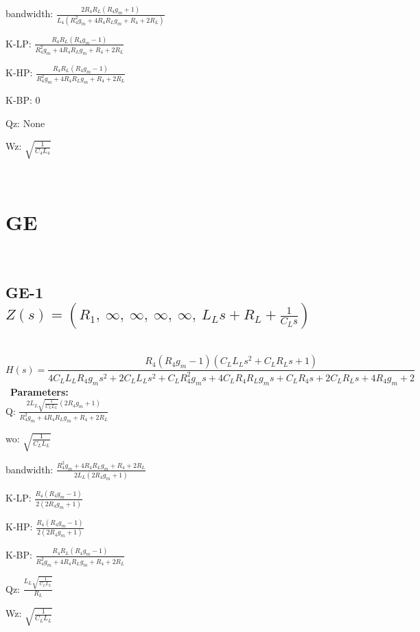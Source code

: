 \documentclass{article}
\begin{document}
bandwidth: $\frac{2 R_{4} R_{L} \left(R_{4} g_{m} + 1\right)}{L_{4} \left(R_{4}^{2} g_{m} + 4 R_{4} R_{L} g_{m} + R_{4} + 2 R_{L}\right)}$\ 

K-LP: $\frac{R_{4} R_{L} \left(R_{4} g_{m} - 1\right)}{R_{4}^{2} g_{m} + 4 R_{4} R_{L} g_{m} + R_{4} + 2 R_{L}}$\ 

K-HP: $\frac{R_{4} R_{L} \left(R_{4} g_{m} - 1\right)}{R_{4}^{2} g_{m} + 4 R_{4} R_{L} g_{m} + R_{4} + 2 R_{L}}$\ 

K-BP: $0$\ 

Qz: $\text{None}$\ 

Wz: $\sqrt{\frac{1}{C_{4} L_{4}}}$\ 

\ 

\section{GE}\ 
\subsection{GE-1 $Z(s) = \left( R_{1}, \  \infty, \  \infty, \  \infty, \  \infty, \  L_{L} s + R_{L} + \frac{1}{C_{L} s}\right)$ } \ 
\textbf{\[H(s) = \frac{R_{4} \left(R_{4} g_{m} - 1\right) \left(C_{L} L_{L} s^{2} + C_{L} R_{L} s + 1\right)}{4 C_{L} L_{L} R_{4} g_{m} s^{2} + 2 C_{L} L_{L} s^{2} + C_{L} R_{4}^{2} g_{m} s + 4 C_{L} R_{4} R_{L} g_{m} s + C_{L} R_{4} s + 2 C_{L} R_{L} s + 4 R_{4} g_{m} + 2}\] } \ 
\textbf{Parameters:}\\ 

Q: $\frac{2 L_{L} \sqrt{\frac{1}{C_{L} L_{L}}} \left(2 R_{4} g_{m} + 1\right)}{R_{4}^{2} g_{m} + 4 R_{4} R_{L} g_{m} + R_{4} + 2 R_{L}}$\ 

wo: $\sqrt{\frac{1}{C_{L} L_{L}}}$\ 

bandwidth: $\frac{R_{4}^{2} g_{m} + 4 R_{4} R_{L} g_{m} + R_{4} + 2 R_{L}}{2 L_{L} \left(2 R_{4} g_{m} + 1\right)}$\ 

K-LP: $\frac{R_{4} \left(R_{4} g_{m} - 1\right)}{2 \left(2 R_{4} g_{m} + 1\right)}$\ 

K-HP: $\frac{R_{4} \left(R_{4} g_{m} - 1\right)}{2 \left(2 R_{4} g_{m} + 1\right)}$\ 

K-BP: $\frac{R_{4} R_{L} \left(R_{4} g_{m} - 1\right)}{R_{4}^{2} g_{m} + 4 R_{4} R_{L} g_{m} + R_{4} + 2 R_{L}}$\ 

Qz: $\frac{L_{L} \sqrt{\frac{1}{C_{L} L_{L}}}}{R_{L}}$\ 

Wz: $\sqrt{\frac{1}{C_{L} L_{L}}}$\ 

\ 
\end{document}
